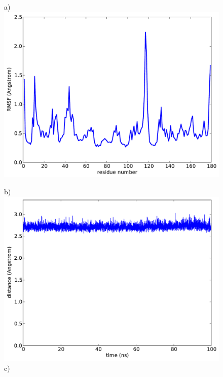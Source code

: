 \documentclass[english, a4paper, 12pt, titlepage, draft]{article}
\begin{document}
\begin{figure}
    \begin{minipage}[]{0.45\linewidth}
        \centering
        a)
        \includegraphics[width=\textwidth]{figures/BSLA_solo/BSLA_solo_rmsf.pdf}  
    \end{minipage}
\hspace{0.5cm}
    \begin{minipage}[]{0.45\linewidth}
        \centering
        b)
        \includegraphics[width=\textwidth]{figures/BSLA_solo/BSLA_solo_dist_ASP133_HIS156.pdf} 
        c)

\end{minipage}
\end{figure}
\end{document}
